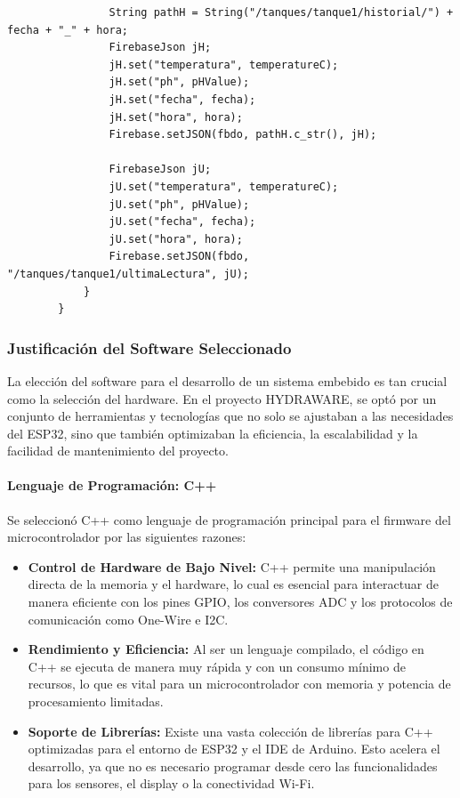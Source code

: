 \documentclass[a4paper,12pt]{article}
\begin{document}
\begin{verbatim}
				String pathH = String("/tanques/tanque1/historial/") + fecha + "_" + hora;
				FirebaseJson jH;
				jH.set("temperatura", temperatureC);
				jH.set("ph", pHValue);
				jH.set("fecha", fecha);
				jH.set("hora", hora);
				Firebase.setJSON(fbdo, pathH.c_str(), jH);
				
				FirebaseJson jU;
				jU.set("temperatura", temperatureC);
				jU.set("ph", pHValue);
				jU.set("fecha", fecha);
				jU.set("hora", hora);
				Firebase.setJSON(fbdo, "/tanques/tanque1/ultimaLectura", jU);
			}
		}
	\end{verbatim}
	
	
	\subsubsection{Justificación del Software Seleccionado}
	La elección del software para el desarrollo de un sistema embebido es tan crucial como la selección del hardware. En el proyecto HYDRAWARE, se optó por un conjunto de herramientas y tecnologías que no solo se ajustaban a las necesidades del ESP32, sino que también optimizaban la eficiencia, la escalabilidad y la facilidad de mantenimiento del proyecto.
	
	\paragraph{Lenguaje de Programación: C++}
	Se seleccionó C++ como lenguaje de programación principal para el firmware del microcontrolador por las siguientes razones:
	\begin{itemize}
		\item \textbf{Control de Hardware de Bajo Nivel:} C++ permite una manipulación directa de la memoria y el hardware, lo cual es esencial para interactuar de manera eficiente con los pines GPIO, los conversores ADC y los protocolos de comunicación como One-Wire e I2C.
		\item \textbf{Rendimiento y Eficiencia:} Al ser un lenguaje compilado, el código en C++ se ejecuta de manera muy rápida y con un consumo mínimo de recursos, lo que es vital para un microcontrolador con memoria y potencia de procesamiento limitadas.
		\item \textbf{Soporte de Librerías:} Existe una vasta colección de librerías para C++ optimizadas para el entorno de ESP32 y el IDE de Arduino. Esto acelera el desarrollo, ya que no es necesario programar desde cero las funcionalidades para los sensores, el display o la conectividad Wi-Fi.
	\end{itemize}
	
\end{document}
